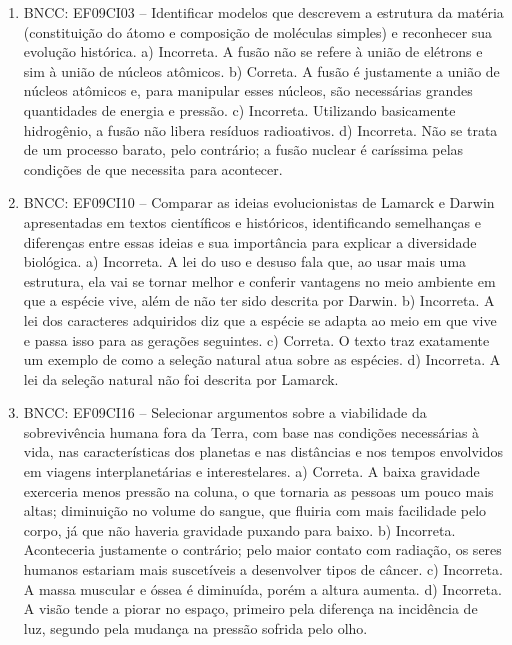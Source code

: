 \begin{enumerate}
\item
BNCC: EF09CI03 -- Identificar modelos que descrevem a
estrutura da matéria (constituição do átomo e composição de moléculas
simples) e reconhecer sua evolução histórica.
a)  Incorreta. A fusão não se refere à união de elétrons e sim à
  união de núcleos atômicos.
b)  Correta. A fusão é justamente a união de núcleos atômicos e, para
  manipular esses núcleos, são necessárias grandes quantidades de energia e pressão.
c)  Incorreta. Utilizando basicamente hidrogênio, a fusão não libera resíduos radioativos.
d)  Incorreta. Não se trata de um processo barato, pelo contrário; a
  fusão nuclear é caríssima pelas condições de que necessita para acontecer.

\item
BNCC: EF09CI10 -- Comparar as ideias evolucionistas
de Lamarck e Darwin apresentadas em textos científicos e históricos,
identificando semelhanças e diferenças entre essas ideias e sua
importância para explicar a diversidade biológica.
a)  Incorreta. A lei do uso e desuso fala que, ao usar mais uma
  estrutura, ela vai se tornar melhor e conferir vantagens no meio
  ambiente em que a espécie vive, além de não ter sido descrita por
  Darwin.
b)  Incorreta. A lei dos caracteres adquiridos diz que a espécie se
  adapta ao meio em que vive e passa isso para as gerações seguintes.
c)  Correta. O texto traz exatamente um exemplo de como a seleção natural atua sobre as espécies.
d)  Incorreta. A lei da seleção natural não foi descrita por Lamarck.

\item
BNCC: EF09CI16 -- Selecionar argumentos sobre a
viabilidade da sobrevivência humana fora da Terra, com base nas
condições necessárias à vida, nas características dos planetas e nas
distâncias e nos tempos envolvidos em viagens interplanetárias e
interestelares.
a)  Correta. A baixa gravidade exerceria menos pressão na coluna, o
  que tornaria as pessoas um pouco mais altas;  diminuição no
  volume do sangue, que fluiria com mais facilidade pelo corpo, já que não
  haveria gravidade puxando para baixo.
b)  Incorreta. Aconteceria justamente o contrário; pelo maior contato
  com radiação, os seres humanos estariam mais suscetíveis a desenvolver
  tipos de câncer.
c)  Incorreta. A massa muscular e óssea é diminuída, porém a altura aumenta.
d)  Incorreta. A visão tende a piorar no espaço, primeiro pela
  diferença na incidência de luz, segundo pela mudança na pressão sofrida pelo olho.
\end{enumerate}

\blankpage
